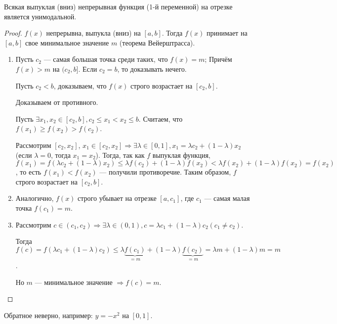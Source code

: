 \begin{theorem}
	Всякая выпуклая (вниз) непрерывная функция (1-й переменной) на отрезке является унимодальной.
\end{theorem}
\begin{proof}
	$f(x)$ непрерывна, выпукла (вниз) на $[a, b]$. Тогда $f(x)$ принимает на $[a, b]$ свое минимальное значение $m$ (теорема Вейерштрасса).
	\begin{enumerate}[label={(\arabic*)}]
		\item Пусть $c_2$ --- самая большая точка среди таких, что $f(x) = m$;
      Причём $f(x) > m$ на $(c_2, b]$. Если $c_2 = b$, то доказывать нечего. 
		
		Пусть $c_2 < b$, доказываем, что $f(x)$ строго возрастает на $[c_2, b]$. 
		
		Доказываем от противного.
		
		Пусть $\exists x_1, x_2 \in [c_2, b], c_2 \leqslant x_1 < x_2 \leqslant b$. Считаем, что $f(x_1) \geqslant f(x_2) > f(c_2)$.
		
		Рассмотрим $[c_2, x_2]$, $x_1 \in [c_2, x_2] \Rightarrow \exists \lambda \in [0, 1], x_1 = \lambda c_2 + (1 - \lambda) x_2$
    (если $\lambda = 0$, тогда $x_1 = x_2$). Тогда, так как $f$ выпуклая функция,
    $f(x_1) = f(\lambda c_2 + (1 - \lambda) x_2) \leqslant \lambda f(c_2) + (1 - \lambda) f(x_2) < \lambda f(x_2) + (1 - \lambda) f(x_2) = f(x_2)$,
    то есть $f(x_1) < f(x_2)$ --- получили противоречие. Таким образом, $f$ строго возрастает на $[c_2, b]$.
		
		\item Аналогично, $f(x)$ строго убывает на отрезке $[a, c_1]$, где $c_1$ --- самая малая точка $f(c_1) = m$.
		
		\item Рассмотрим $c \in (c_1, c_2) \Rightarrow \exists \lambda \in (0, 1), c = \lambda c_1 + (1 - \lambda) c_2 (c_1 \not = c_2)$.
		
		Тогда $f(c) = f(\lambda c_1 + (1 - \lambda) c_2) \leqslant \lambda \underbrace{f(c_1)}_{= m} + (1 - \lambda) \underbrace{f(c_2)}_{= m} = \lambda m + (1 - \lambda) m = m$.
		
		Но $m$ --- минимальное значение $\Rightarrow f(c) = m$.
	\end{enumerate}
\end{proof}

\begin{utv}
	Обратное неверно, например: $y = - x^2$ на $[0, 1]$.
\end{utv}

